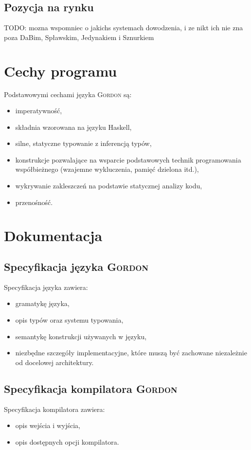 \documentclass{documentation}
\begin{document}
\subsection{Pozycja na rynku}
TODO: mozna wspomniec o jakichs systemach dowodzenia, i ze nikt ich nie zna poza DaBim, Spławskim, Jedynakiem i Sznurkiem

\section{Cechy programu}
\noindent Podstawowymi cechami języka \textsc{Gordon} są:
\begin{itemize}
\item imperatywność,
\item składnia wzorowana na języku Haskell,
\item silne, statyczne typowanie z inferencją typów,
\item konstrukcje pozwalające na wsparcie podstawowych technik programowania współbieżnego (wzajemne wykluczenia, pamięć dzielona itd.),
\item wykrywanie zakleszczeń na podstawie statycznej analizy kodu,
\item przenośność.
\end{itemize}

\section{Dokumentacja}
\subsection{Specyfikacja języka \textsc{Gordon}}
\noindent Specyfikacja języka zawiera:
\begin{itemize}
\item gramatykę języka,
\item opis typów oraz systemu typowania,
\item semantykę konstrukcji używanych w języku,
\item niezbędne szczegóły implementacyjne, które muszą być zachowane niezależnie od docelowej architektury.
\end{itemize}

\subsection{Specyfikacja kompilatora \textsc{Gordon}}
\noindent Specyfikacja kompilatora zawiera:
\begin{itemize}
\item opis wejścia i wyjścia,
\item opis dostępnych opcji kompilatora.
\end{itemize}
\end{document}
